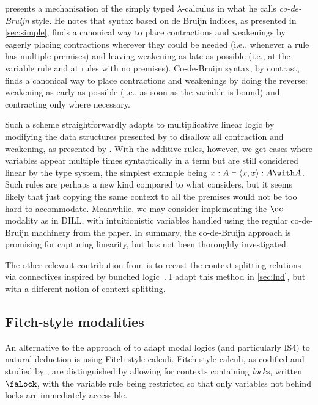  presents a mechanisation of the simply typed
$\lambda$-calculus in what he calls \emph{co-de-Bruijn} style.
He notes that syntax based on de Bruijn indices, as presented in
\cref{sec:simple}, finds a canonical way to place contractions and weakenings
by eagerly placing contractions wherever they could be needed (i.e., whenever a
rule has multiple premises) and leaving weakening as late as possible (i.e., at
the variable rule and at rules with no premises).
Co-de-Bruijn syntax, by contrast, finds a canonical way to place contractions
and weakenings by doing the reverse: weakening as early as possible (i.e., as
soon as the variable is bound) and contracting only where necessary.

Such a scheme straightforwardly adapts to multiplicative linear logic by
modifying the data structures presented by \citet{McBride18} to disallow all
contraction and weakening, as presented by \citet{RPKV20}.
With the additive rules, however, we get cases where variables appear multiple
times syntactically in a term but are still considered linear by the type
system, the simplest example being
$x : A \vdash \langle x, x\rangle : A \with A$.
Such rules are perhaps a new kind compared to what \citeauthor{McBride18}
considers, but it seems likely that just copying the same context to all the
premises would not be too hard to accommodate.
Meanwhile, we may consider implementing the $\oc$-modality as in DILL, with
intuitionistic variables handled using the regular co-de-Bruijn machinery from
the paper.
In summary, the co-de-Bruijn approach is promising for capturing linearity, but
has not been thoroughly investigated.

The other relevant contribution from \citet{RPKV20} is to recast the
context-splitting relations via connectives inspired by bunched
logic~\citet{oHP99}.
I adapt this method in \cref{sec:lnd}, but with a different notion of
context-splitting.

\subsection{Fitch-style modalities}\label{sec:fitch}

An alternative to the approach of \citet{judgmental} to adapt modal logics (and
particularly IS4) to natural deduction is using Fitch-style calculi.
Fitch-style calculi, as codified and studied by \citet{Borghuis-thesis}, are
distinguished by allowing for contexts containing \emph{locks}, written $\Lock$,
with the variable rule being restricted so that only variables not behind locks
are immediately accessible.

